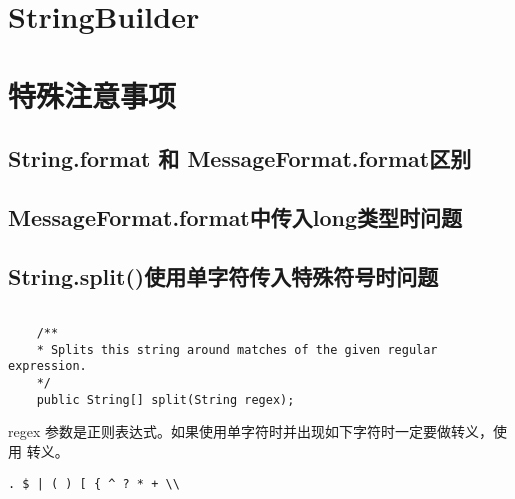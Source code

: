 \section{StringBuilder}


\section{特殊注意事项}

\subsection{String.format 和 MessageFormat.format区别}


\subsection{MessageFormat.format中传入long类型时问题}


\subsection{String.split()使用单字符传入特殊符号时问题}

\begin{lstlisting}[style=cjava]

    /**
    * Splits this string around matches of the given regular expression.
    */
    public String[] split(String regex);

\end{lstlisting}

regex 参数是正则表达式。如果使用单字符时并出现如下字符时一定要做转义，使用 \menlo{$\backslash$$\backslash$} 转义。

\begin{lstlisting}[style=cjava]
    . $ | ( ) [ { ^ ? * + \\
\end{lstlisting}


